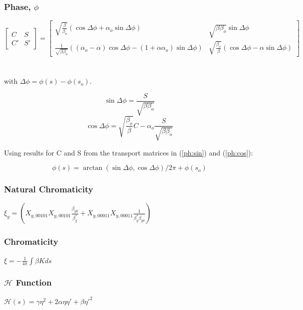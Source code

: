 \documentclass[a4paper]{cernatsnote}
\begin{document}
\subsubsection{Phase, $\phi$}
\label{ap:phase}
\[
\begin{bmatrix}
C & S\\[0.3em]
C' & S'
\end{bmatrix}
=
\begin{bmatrix}
\sqrt{\frac{\beta}{\beta_o}}(\cos{\Delta \phi} + \alpha_o \sin{\Delta
  \phi}) & \sqrt{\beta \beta_o} \sin{\Delta \phi}\\[0.3em]
\frac{1}{\sqrt{\beta \beta_o}}((\alpha_o - \alpha)\cos{\Delta \phi} -
(1+ \alpha \alpha_o)\sin{\Delta \phi}) &
\sqrt{\frac{\beta_o}{\beta}}(\cos{\Delta \phi} - \alpha \sin{\Delta
  \phi})
\end{bmatrix}
\]
\\\\
with $\Delta \phi = \phi (s) - \phi (s_o)$.

\begin{equation}
\label{ph:sin}
\sin{\Delta \phi} = \frac{S}{\sqrt{\beta \beta_o}}
\end{equation}
\begin{equation}
\label{ph:cos}
\cos{\Delta \phi} = \sqrt{\frac{\beta_o}{\beta}}C - \alpha_o
\frac{S}{\sqrt{\beta \beta_o}}
\end{equation}

Using results for C and S from  the transport matrices in
(\ref{ph:sin}) and (\ref{ph:cos}):

\[
\phi(s) = \arctan(\sin{\Delta \phi},\cos{\Delta
\phi})/2\pi + \phi (s_o)
\]

\subsubsection{Natural Chromaticity}
\label{ap:natchrom}
$\xi_y = (X_{y,00101}X_{y,00101} \frac{\beta_{y0}}{\beta^*_y} +
X_{y,00011}X_{y,00011} \frac{1}{\beta^*_y \beta_{y0}} )$

\subsubsection{Chromaticity}
\label{ap:chrom}
$\xi = -\frac{1}{4\pi} \int \beta K ds$

\subsubsection{$\mathcal{H}$ Function}
\label{ap:h}
$\mathcal{H}(s) = \gamma \eta^2 + 2 \alpha \eta\eta' + \beta \eta'^2$
\end{document}
